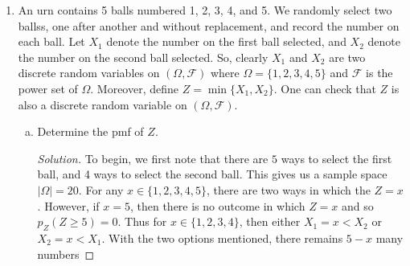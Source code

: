 \documentclass[12pt]{article}
\newenvironment{solution}
{\renewcommand\qedsymbol{$\blacksquare$}\begin{proof}[Solution]}
{\end{proof}}
\begin{document}
\begin{enumerate}
\begin{enumerate}[(a)]
\begin{solution}
                        \begin{equation*}
                            P(Y>2a/3)=1-P(Y\leq 2a/3)=F_Y(2a/3).
                        \end{equation*}
                        Then using (7) from above we have that 
                        \begin{equation*}
                            F_Y(2a/3)=(F_X(2a/3))^{10}.
                        \end{equation*}
                        Since $0<\frac{2a}{3}<a$, then $F_X(2a/3)=2/3$. Thus 
                        \begin{equation*}
                            P(Y>2a/3)=1-\bigg(\frac{2}{3}\bigg)^{10}\approx
                            0.983.
                        \end{equation*}
                    \end{solution}
            \end{enumerate}
        \item An urn contains 5 balls numbered 1, 2, 3, 4, and 5. We randomly
            select two ballss, one after another and without replacement, and
            record the number on each ball. Let $X_1$ denote the number on the
            first ball selected, and $X_2$ denote the number on the second ball
            selected. So, clearly $X_1$ and $X_2$ are two discrete random
            variables on $(\Omega, \mathcal{F})$ where $\Omega=\{1, 2, 3, 4,
            5\}$ and $\mathcal{F}$ is the power set of $\Omega$. Moreover,
            define $Z=\min\{X_1, X_2\}$. One can check that $Z$ is also
            a discrete random variable on $(\Omega, \mathcal{F})$. 
            \begin{enumerate}[(a)]
                \item Determine the pmf of $Z$. 
                    \begin{solution}
                        To begin, we first note that there are $5$ ways to
                        select the first ball, and 4 ways to select the second
                        ball. This gives us a sample space $|\Omega|=20$. For
                        any $x\in\{1, 2, 3, 4, 5\}$, there are two ways in
                        which the $Z=x$.
                        However, if $x=5$, then there is no outcome in which
                        $Z=x$ and so $p_Z(Z\geq 5)=0$. Thus for $x\in\{1, 2, 3,
                        4\}$, then either $X_1=x<X_2$ or $X_2=x<X_1$. With the
                        two options mentioned, there remains $5-x$ many numbers

\end{solution}
\end{enumerate}
\end{enumerate}
\end{document}
